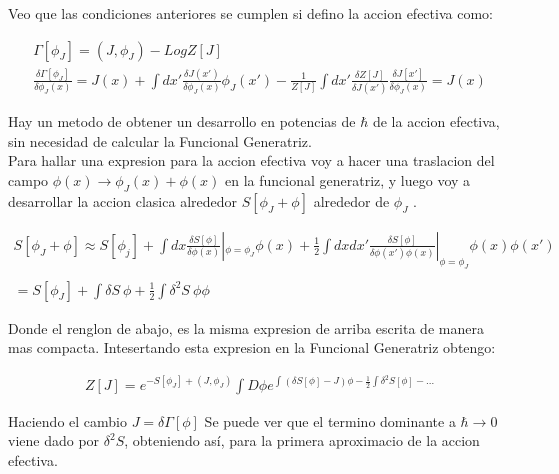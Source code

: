 Veo que las condiciones anteriores se cumplen si defino la accion efectiva como:

\begin{equation}
\begin{array}{c}
\Gamma [\phi _J] = (J, \phi _J) - Log Z [J] \\
\frac{\delta \Gamma [ \phi _J ]}{\delta \phi _J (x) } = 
J(x) + \int dx ' \frac{\delta J (x')}{\delta \phi _J (x) } \phi _J (x') - 
\frac{1}{Z[J]} \int dx' \frac{\delta Z[J] }{\delta J(x')} \frac{\delta J[x']}{\delta \phi _J (x)} = J(x)
\end{array}
\end{equation}

Hay un metodo de obtener un desarrollo en potencias de $\hbar$ de la accion efectiva, sin necesidad de calcular la Funcional Generatriz. \\


Para hallar una expresion para la accion efectiva voy a hacer una traslacion del campo $\phi (x) \rightarrow \phi _{J} (x) + \phi (x) $ en la funcional generatriz, y luego voy a desarrollar la accion clasica alrededor  $ S[ \phi _J + \phi ] $ alrededor de $ \phi _J $ .

\begin{equation}
\begin{array}{c}
S [\phi _J + \phi ] \approx
S[ \phi _j ] +
\int dx \frac{\delta S[\phi]}{\delta \phi (x) } | _ {\phi = \phi _J} \phi( x ) +
\frac{1}{2}
\int dx dx' \frac{\delta S[\phi]}{\delta \phi (x') \phi (x) } | _ {\phi = \phi _J} \phi( x ) \phi (x')  \\ \\
= S[ \phi _J ] + \int \delta S \ \phi + \frac{1}{2} \int \delta ^2 S \ \phi \phi
\end{array}
\end{equation}

Donde el renglon de abajo, es la misma expresion de arriba escrita de manera mas compacta. Intesertando  esta expresion en la Funcional Generatriz obtengo:

\begin{equation}
\begin{array}{c}
Z[J] = e ^{-S[ \phi _J ] + (J, \phi _J )} 
\int D \phi e ^{ \int (\delta S [\phi] - J) \phi - \frac{1}{2} \int \delta ^2 S[\phi ] - ... }
\end{array}
\end{equation}

Haciendo el cambio $J = \delta \Gamma [ \phi ]$ Se puede ver que el termino dominante a $\hbar \rightarrow 0$ viene dado por $\delta ^2 S$, obteniendo así, para la primera aproximacio de la accion efectiva.





